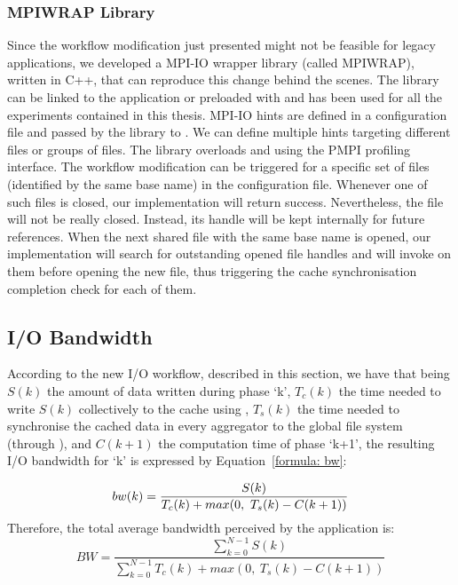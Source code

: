 \subsubsection{MPIWRAP Library}
\label{subsubsec: mpiwrap}
Since the workflow modification just presented might not be feasible for legacy applications, we developed a MPI-IO wrapper library (called MPIWRAP), written in C++, that can reproduce this change behind the scenes. The library can be linked to the application or preloaded with  and has been used for all the experiments contained in this thesis. MPI-IO hints are defined in a configuration file and passed by the library to . We can define multiple hints targeting different files or groups of files. The library overloads  and  using the PMPI profiling interface. The workflow modification can be triggered for a specific set of files (identified by the same base name) in the configuration file. Whenever one of such files is closed, our  implementation will return success. Nevertheless, the file will not be really closed. Instead, its handle will be kept internally for future references. When the next shared file with the same base name is opened, our  implementation will search for outstanding opened file handles and will invoke  on them before opening the new file, thus triggering the cache synchronisation completion check for each of them.

\subsection{I/O Bandwidth}
\label{subsec: bw-impr}
According to the new I/O workflow, described in this section, we have that being $S(k)$ the amount of data written during phase `k', $T_c(k)$ the time needed to write $S(k)$ collectively to the cache using , $T_s(k)$ the time needed to synchronise the cached data in every aggregator to the global file system (through ), and $C(k+1)$ the computation time of phase `k+1', the resulting I/O bandwidth for `k' is expressed by Equation~\ref{formula: bw}:

\begin{equation}\label{formula: bw}
        bw(k) = \frac{S(k)}{T_c(k) + max(0,\ T_s(k) - C(k+1))} \\
\end{equation}
Therefore, the total average bandwidth perceived by the application is:
\begin{equation}\label{formula: abw}
        BW = \frac{\sum_{k=0}^{N-1} S(k)}{\sum_{k=0}^{N-1} T_c(k) + max(0,\ T_s(k) - C(k+1))}
\end{equation}

